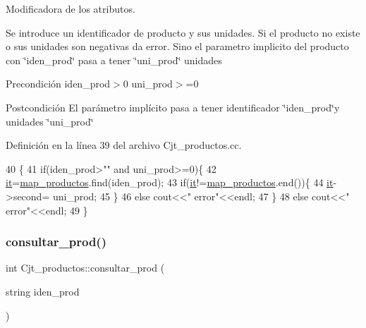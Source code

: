 Modificadora de los atributos. 

Se introduce un identificador de producto y sus unidades. Si el producto no existe o sus unidades son negativas da error. Sino el parametro implicito del producto con \char`\"{}iden\+\_\+prod\char`\"{} pasa a tener \char`\"{}uni\+\_\+prod\char`\"{} unidades \begin{DoxyPrecond}{Precondición}
iden\+\_\+prod$>$0 uni\+\_\+prod$>$=0 
\end{DoxyPrecond}
\begin{DoxyPostcond}{Postcondición}
El parámetro implícito pasa a tener identificador \char`\"{}iden\+\_\+prod\char`\"{}y unidades \char`\"{}uni\+\_\+prod\char`\"{} 
\end{DoxyPostcond}


Definición en la línea 39 del archivo Cjt\+\_\+productos.\+cc.


\begin{DoxyCode}
40 \{
41   \textcolor{keywordflow}{if}(iden\_prod>\textcolor{stringliteral}{""} and uni\_prod>=0)\{
42     \hyperlink{class_cjt__productos_adedbe2194ed053eb446ec367e6d5e60e}{it}=\hyperlink{class_cjt__productos_a44e63c644fdec6cff81dcdb3cf79860c}{map\_productos}.find(iden\_prod);
43     \textcolor{keywordflow}{if}(\hyperlink{class_cjt__productos_adedbe2194ed053eb446ec367e6d5e60e}{it}!=\hyperlink{class_cjt__productos_a44e63c644fdec6cff81dcdb3cf79860c}{map\_productos}.end())\{
44       \hyperlink{class_cjt__productos_adedbe2194ed053eb446ec367e6d5e60e}{it}->second= uni\_prod; 
45     \}
46     \textcolor{keywordflow}{else} cout<<\textcolor{stringliteral}{"  error"}<<endl;
47   \}
48   \textcolor{keywordflow}{else} cout<<\textcolor{stringliteral}{"  error"}<<endl;
49 \}
\end{DoxyCode}
\mbox{\label{class_cjt__productos_a8198f3b57f6d1d9fd4096e3e19fe9a46}} 
\subsubsection{\texorpdfstring{consultar\+\_\+prod()}{consultar\_prod()}}
{\footnotesize\ttfamily int Cjt\+\_\+productos\+::consultar\+\_\+prod (\begin{DoxyParamCaption}\item[{string}]{iden\+\_\+prod }\end{DoxyParamCaption})}



